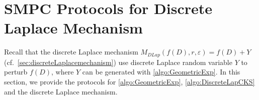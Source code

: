       \section{SMPC Protocols for Discrete Laplace Mechanism}
      \label{sec:MPCProtocolsforDiscreteLaplaceMechanism}

      Recall that the discrete Laplace mechanism $M_{DLap}\left(f\left(D\right),r,\varepsilon\right)=f\left(D\right) +Y$ (cf.~\autoref{sec:discreteLaplacemechanism}) use discrete Laplace random variable $Y $ to perturb $f\left(D\right)$, where $Y$ can be generated with \autoref{algo:GeometricExp}.
      In this section, we provide the \smpc protocols for \autoref{algo:GeometricExp}, \autoref{algo:DiscreteLapCKS} and the discrete Laplace mechanism.



